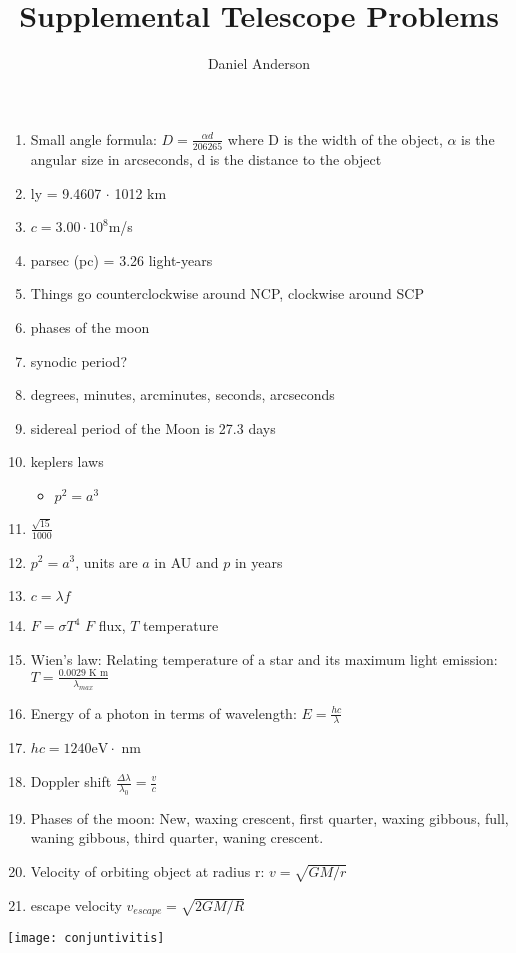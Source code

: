 \documentclass[11pt]{article}
\begin{document}
\author{Daniel Anderson}
\title{Supplemental Telescope Problems}
\maketitle

\begin{enumerate}
    \item Small angle formula: $D = \frac{\alpha d}{206265}$ where D is the width of the object, $\alpha$ is the angular size in arcseconds, d is the distance to the object
    \item ly = 9.4607 $\cdot$ 1012 km
    \item $c = 3.00 \cdot 10^8 $m/s 
    \item parsec (pc) = 3.26 light-years
    \item Things go counterclockwise around NCP, clockwise around SCP
    \item phases of the moon
    \item synodic period?
    \item degrees, minutes, arcminutes, seconds, arcseconds
    \item sidereal period of the Moon is 27.3 days
    \item keplers laws
    \begin{itemize}
        \item $p^2 = a^3$
    \end{itemize}
    \item $\frac{\sqrt{15}}{1000}$
    \item $p^2=a^3$, units are $a$ in AU and $p$ in  years
    \item $c=\lambda f$
    \item $F = \sigma T^4$ $F$ flux, $T$ temperature
    \item Wien's law: Relating temperature of a star and its maximum light emission: $T = \frac{0.0029 \text{ K m}}{\lambda_{max}}$
    \item Energy of a photon in terms of wavelength: $E = \frac{hc}{\lambda}$
    \item $hc = 1240 \text{eV} \cdot $ nm
    \item Doppler shift $\frac{\Delta \lambda}{\lambda_0} = \frac{v}{c}$
    \item Phases of the moon: New, waxing crescent, first quarter, waxing gibbous, full, waning gibbous, third quarter, waning crescent.
    \item Velocity of orbiting object at radius r: $v = \sqrt{GM/r}$
    \item escape velocity $v_{escape} = \sqrt{2GM/R}$
\end{enumerate}
\texttt{[image: conjuntivitis]}
\end{document}
